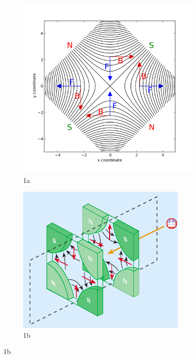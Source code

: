 \documentclass[encoding=utf8,british]{tumphthesis}
\begin{document}
\begin{figure}[H]
    \centering
    \begin{subfigure}{.5\textwidth}
        \includegraphics[width=1.0\linewidth]{figures/540px-Magnetic_field_of_an_idealized_quadrupole_with_forces.svg.png}
      \caption{1a}
    \end{subfigure}%
    \begin{subfigure}{.5\textwidth}
    \centering
        \includegraphics[width=1.0\linewidth]{figures/two-quadrupoles.png}
      \caption{1b}
    \label{fig:sfig2}
    \end{subfigure}
    

\end{figure}
\end{document}
